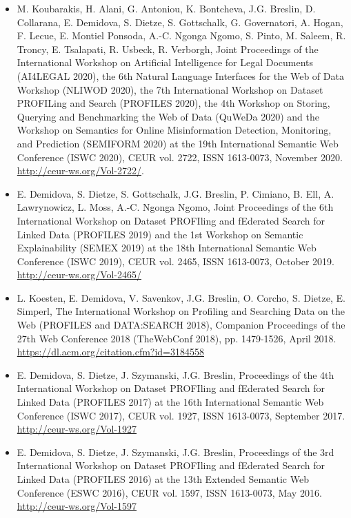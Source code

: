 \documentclass[10pt,a4paper]{res} %
\begin{document}
\begin{resume}
\begin{itemize} \itemsep -2pt
\item M. Koubarakis, H. Alani, G. Antoniou, K. Bontcheva, J.G. Breslin, D. Collarana, E. Demidova, S. Dietze, S. Gottschalk, G. Governatori, A. Hogan, F. Lecue, E. Montiel Ponsoda, A.-C. Ngonga Ngomo, S. Pinto, M. Saleem, R. Troncy, E. Tsalapati, R. Usbeck, R. Verborgh, Joint Proceedings of the International Workshop on Artificial Intelligence for Legal Documents (AI4LEGAL 2020), the 6th Natural Language Interfaces for the Web of Data Workshop (NLIWOD 2020), the 7th International Workshop on Dataset PROFILing and Search (PROFILES 2020), the 4th Workshop on Storing, Querying and Benchmarking the Web of Data (QuWeDa 2020) and the Workshop on Semantics for Online Misinformation Detection, Monitoring, and Prediction (SEMIFORM 2020) at the 19th International Semantic Web Conference (ISWC 2020), CEUR vol. 2722, ISSN 1613-0073, November 2020. \url{http://ceur-ws.org/Vol-2722/}.
\item E. Demidova, S. Dietze, S. Gottschalk, J.G. Breslin, P. Cimiano, B. Ell, A. Lawrynowicz, L. Moss, A.-C. Ngonga Ngomo, Joint Proceedings of the 6th International Workshop on Dataset PROFIling and fEderated Search for Linked Data (PROFILES 2019) and the 1st Workshop on Semantic Explainability (SEMEX 2019) at the 18th International Semantic Web Conference (ISWC 2019), CEUR vol. 2465, ISSN 1613-0073, October 2019. \url{http://ceur-ws.org/Vol-2465/}
\item L. Koesten, E. Demidova, V. Savenkov, J.G. Breslin, O. Corcho, S. Dietze, E. Simperl, The International Workshop on Profiling and Searching Data on the Web (PROFILES and DATA:SEARCH 2018), Companion Proceedings of the 27th Web Conference 2018 (TheWebConf 2018), pp. 1479-1526, April 2018. \url{https://dl.acm.org/citation.cfm?id=3184558}
\item E. Demidova, S. Dietze, J. Szymanski, J.G. Breslin, Proceedings of the 4th International Workshop on Dataset PROFIling and fEderated Search for Linked Data (PROFILES 2017) at the 16th International Semantic Web Conference (ISWC 2017), CEUR vol. 1927, ISSN 1613-0073, September 2017. \url{http://ceur-ws.org/Vol-1927}
\item E. Demidova, S. Dietze, J. Szymanski, J.G. Breslin, Proceedings of the 3rd International Workshop on Dataset PROFIling and fEderated Search for Linked Data (PROFILES 2016) at the 13th Extended Semantic Web Conference (ESWC 2016), CEUR vol. 1597, ISSN 1613-0073, May 2016. \url{http://ceur-ws.org/Vol-1597}

\end{itemize}
\end{resume}
\end{document}
